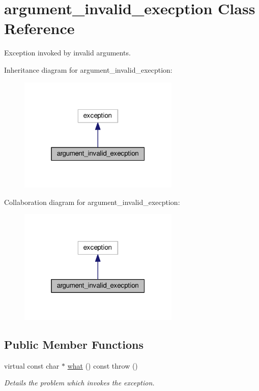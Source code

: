 \hypertarget{classargument__invalid__execption}{}\section{argument\+\_\+invalid\+\_\+execption Class Reference}
\label{classargument__invalid__execption}


Exception invoked by invalid arguments.  




Inheritance diagram for argument\+\_\+invalid\+\_\+execption\+:\nopagebreak
\begin{figure}[H]
\begin{center}
\leavevmode
\includegraphics[width=217pt]{classargument__invalid__execption__inherit__graph}
\end{center}
\end{figure}


Collaboration diagram for argument\+\_\+invalid\+\_\+execption\+:\nopagebreak
\begin{figure}[H]
\begin{center}
\leavevmode
\includegraphics[width=217pt]{classargument__invalid__execption__coll__graph}
\end{center}
\end{figure}
\subsection*{Public Member Functions}
\begin{DoxyCompactItemize}
\item 
virtual const char $\ast$ \hyperlink{classargument__invalid__execption_a195981d8dc3b6f1374c920e63eaf8ba8}{what} () const   throw ()
\begin{DoxyCompactList}\small\item\em Details the problem which invokes the exception. \end{DoxyCompactList}\end{DoxyCompactItemize}
